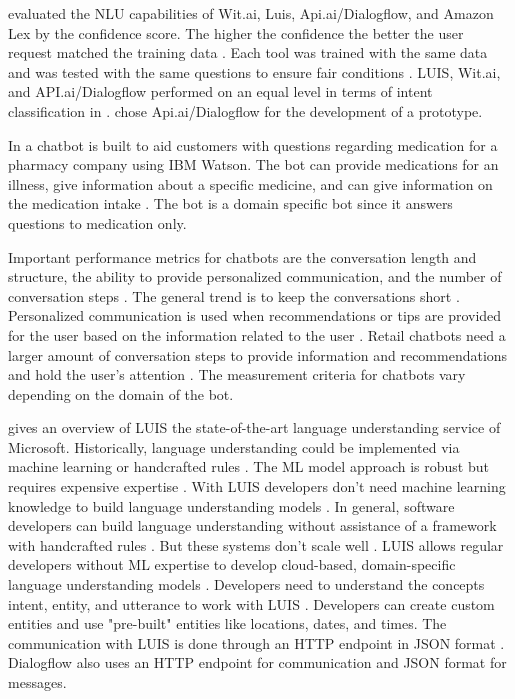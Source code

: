 \citet{gregori2017evaluation} evaluated the NLU capabilities of Wit.ai, Luis, Api.ai/Dialogflow, and Amazon Lex
by the confidence score. 
The higher the confidence the better the user request matched the training data \citet{gregori2017evaluation}.
Each tool was trained with the same data and was tested with the same questions to ensure fair conditions \citet{gregori2017evaluation}.
LUIS, Wit.ai, and API.ai/Dialogflow performed on an equal level in terms of intent classification in \citet{gregori2017evaluation}.
\citet{gregori2017evaluation} chose Api.ai/Dialogflow for the development of a prototype.

In \citet{pharmacybot} a chatbot is built to aid customers with questions regarding medication for a 
pharmacy company using IBM Watson.
The bot can provide medications for an illness, give information about a specific medicine, and can 
give information on the medication intake \cite{pharmacybot}.
The bot is a domain specific bot since it answers questions to medication only.

Important performance metrics for chatbots are the conversation length and structure, the ability to 
provide personalized communication, and the number of conversation steps \cite{PRZEGALINSKA2019785}.
The general trend is to keep the conversations short \cite{PRZEGALINSKA2019785}.
Personalized communication is used when recommendations or tips are provided for the user based on the 
information related to the user \cite{PRZEGALINSKA2019785}.
Retail chatbots need a larger amount of conversation steps to provide information and recommendations 
and hold the user's attention \cite{PRZEGALINSKA2019785}.
The measurement criteria for chatbots vary depending on the domain of the bot.

\citet{luis2015williams} gives an overview of LUIS the state-of-the-art language understanding service of Microsoft.
Historically, language understanding could be implemented via machine learning or handcrafted rules \cite{luis2015williams}.
The ML model approach is robust but requires expensive expertise \cite{luis2015williams}. 
With LUIS developers don't need machine learning knowledge to build language understanding models \cite{luis2015williams}.
In general, software developers can build language understanding without assistance of a framework
with handcrafted rules \citet{luis2015williams}. 
But these systems don't scale well \cite{luis2015williams}.
LUIS allows regular developers without ML expertise to develop cloud-based, domain-specific language 
understanding models \cite{luis2015williams}.
Developers need to understand the concepts intent, entity, and utterance to work with LUIS \cite{luis2015williams}.
Developers can create custom entities and use "pre-built" entities like locations, dates, and times.
The communication with LUIS is done through an HTTP endpoint in JSON format \cite{luis2015williams}. 
Dialogflow also uses an HTTP endpoint for communication and JSON format for messages. 

